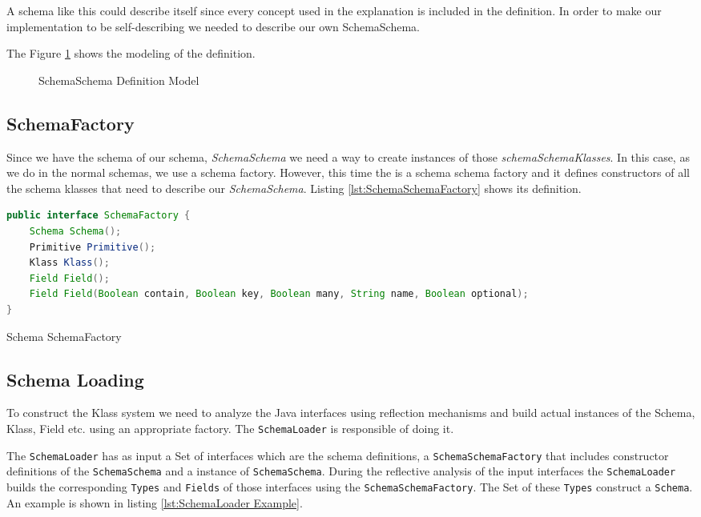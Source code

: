 A schema like this could describe itself since every concept used in the explanation is included in the definition.
In order to make our implementation to be self-describing we needed to describe our own SchemaSchema. 

The Figure \ref{fig:SchemaSchema_definition} shows the modeling of the definition.

\begin{figure}[H]
	\centering
  	\caption{SchemaSchema Definition Model}
  	\label{fig:SchemaSchema_definition}
\end{figure}

\subsection{SchemaFactory}\label{sec:SchemaFactory}
Since we have the schema of our schema, \textit{SchemaSchema} we need a way to create instances of those \textit{schemaSchemaKlasses}.
In this case, as we do in the normal schemas, we use a schema factory. 
However, this time the is a schema schema factory and it defines constructors of all the schema klasses that need to describe our \textit{SchemaSchema}.
Listing \ref{lst:SchemaSchemaFactory} shows its definition.

\begin{sourcecode} [H]
	\begin{lstlisting}[language=Java, escapechar=|]
public interface SchemaFactory {
    Schema Schema();
    Primitive Primitive();
    Klass Klass();
    Field Field();
    Field Field(Boolean contain, Boolean key, Boolean many, String name, Boolean optional);
}
	\end{lstlisting}
	\caption{Schema SchemaFactory}
	\label{lst:SchemaSchemaFactory}
\end{sourcecode}

\subsection{Schema Loading}\label{sec:Schema Loading}
To construct the Klass system we need to analyze the Java interfaces using reflection mechanisms and build actual instances of the Schema, Klass, Field etc. using an appropriate factory.
The \texttt{SchemaLoader} is responsible of doing it.

The \texttt{SchemaLoader} has as input a Set of interfaces which are the schema definitions, a \texttt{SchemaSchemaFactory} that includes constructor definitions of the \texttt{SchemaSchema} and a instance of \texttt{SchemaSchema}.
During the reflective analysis of the input interfaces the \texttt{SchemaLoader} builds the corresponding \texttt{Types} and \texttt{Fields} of those interfaces using the \texttt{SchemaSchemaFactory}.
The Set of these \texttt{Types} construct a \texttt{Schema}.
An example is shown in listing \ref{lst:SchemaLoader Example}.

